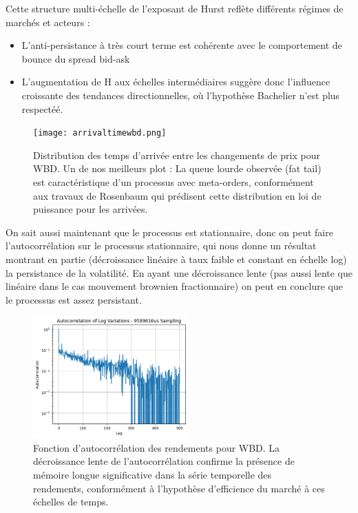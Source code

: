 \documentclass[10pt,a4paper]{article}
\theoremstyle{definition}
\theoremstyle{remark}
\begin{document}
\begin{itemize}
Cette structure multi-échelle de l'exposant de Hurst reflète différents régimes de marchés et acteurs :
\begin{itemize}
    \item L'anti-persistance à très court terme est cohérente avec le comportement de bounce du spread bid-ask
    \item L'augmentation de H aux échelles intermédiaires suggère donc l'influence croissante des tendances directionnelles, où l'hypothèse Bachelier n'est plus respectéé.
\end{itemize}

\begin{figure}[h!]
    \centering
        \texttt{[image: arrivaltimewbd.png]}
    \caption{Distribution des temps d'arrivée entre les changements de prix pour WBD. Un de nos meilleurs plot : La queue lourde observée (fat tail) est caractéristique d'un processus avec meta-orders, conformément aux travaux de Rosenbaum qui prédisent cette distribution en loi de puissance pour les arrivées.}
    \label{fig:arrival_times_wbd}
\end{figure}


On sait aussi maintenant que le processus est stationnaire, donc on peut faire l'autocorrélation sur le processus stationnaire, qui nous donne un résultat montrant en partie
(décroissance linéaire à taux faible et constant en échelle log) la persistance de la volatilité. En ayant une décroissance lente (pas aussi lente que linéaire dans le cas mouvement brownien fractionnaire)
on peut en conclure que le processus est assez persistant.

\begin{figure}[h!]
    \centering
        \includegraphics[width=0.53\textwidth]{autocorr.png}
    \caption{Fonction d'autocorrélation des rendements pour WBD. La décroissance lente de l'autocorrélation confirme la présence de mémoire longue significative dans la série temporelle des rendements, conformément à l'hypothèse d'efficience du marché à ces échelles de temps.}
    \label{fig:autocorr_wbd}
\end{figure}




\end{itemize}
\end{document}
